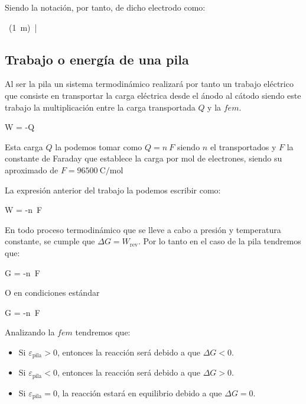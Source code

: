 Siendo la notación, por tanto, de dicho electrodo como:

\begin{centeredequation}
     \ (\SI{1}{\m})\ | \ 
\end{centeredequation}

\subsection{Trabajo o energía de una pila}\label{subsec:trabajo-o-energia-de-una-pila}

Al ser la pila un sistema termodinámico realizará por tanto un trabajo eléctrico que consiste en transportar la carga eléctrica desde el ánodo al cátodo siendo este trabajo la multiplicación entre la carga transportada \(Q\) y la \(fem\).

\begin{centeredequation}
    W = -Q\ \varepsilon
\end{centeredequation}

Esta carga \(Q\) la podemos tomar como \(Q = n\ F\) siendo \(n\) el  transportados y \(F\) la constante de Faraday que establece la carga por mol de electrones, siendo su aproximado de \(F = \SI{96500}{\coulomb\per\mol}\)

La expresión anterior del trabajo la podemos escribir como:

\begin{centeredequation}
    W = -n\ F\ \varepsilon
    \label{eq:trabajo-fuerza-electromotriz}
\end{centeredequation}

En todo proceso termodinámico que se lleve a cabo a presión y temperatura constante, se cumple que \(\Delta G  = W_{\text{rev}} \).
Por lo tanto en el caso de la pila tendremos que:

\begin{centeredequation}
    \Delta G = -n\ F\ \varepsilon
    \label{eq:energia-libre-giibs-fuerza-electromotriz}
\end{centeredequation}

O en condiciones estándar

\begin{centeredequation}
    \Delta G = -n\ F\ \varepsilon{}\label{eq:G-vs-faraday}
\end{centeredequation}

Analizando la \(fem\) tendremos que:

\begin{itemize}
    \item Si \(\varepsilon_{\text{pila}} > 0\), entonces la reacción será  debido a que \(\Delta G <0\).
    \item Si \(\varepsilon_{\text{pila}} < 0\), entonces la reacción  será  debido a que \(\Delta G > 0\).
    \item Si \(\varepsilon_{\text{pila}} = 0\), la reacción estará en equilibrio debido a que \(\Delta G = 0\).
\end{itemize}



